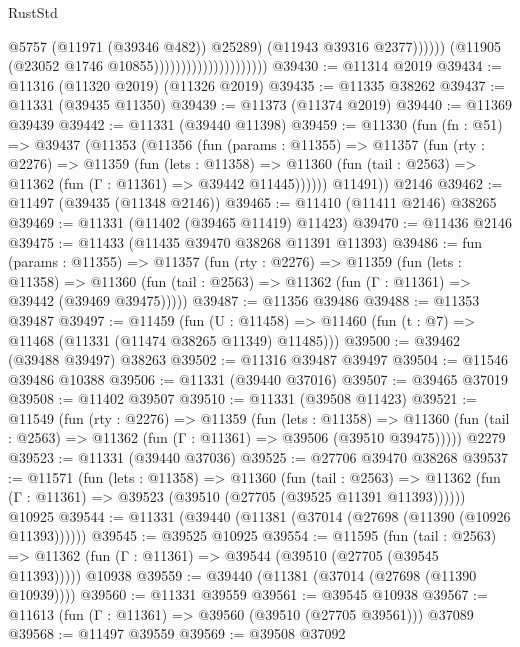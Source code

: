 \begin{lexlean}{RustStd}
\begin{coremodule}
                                                      @5757
                                                      (@11971 (@39346 @482))
                                                      @25289)
                                                    (@11943 @39316 @2377))))))
                                          (@11905 (@23052 @1746 @10855)))))))))))))))))))))
@39430 := @11314 @2019
@39434 := @11316 (@11320 @2019) (@11326 @2019)
@39435 := @11335 @38262
@39437 := @11331 (@39435 @11350)
@39439 := @11373 (@11374 @2019)
@39440 := @11369 @39439
@39442 := @11331 (@39440 @11398)
@39459 := @11330
    (fun (fn : @51) =>
    @39437
      (@11353
        (@11356
          (fun (params : @11355) =>
          @11357
            (fun (rty : @2276) =>
            @11359
              (fun (lets : @11358) =>
              @11360 (fun (tail : @2563) => @11362 (fun (Γ : @11361) => @39442 @11445))))))
        @11491))
    @2146
@39462 := @11497 (@39435 (@11348 @2146))
@39465 := @11410 (@11411 @2146) @38265
@39469 := @11331 (@11402 (@39465 @11419) @11423)
@39470 := @11436 @2146
@39475 := @11433 (@11435 @39470 @38268 @11391 @11393)
@39486 := fun (params : @11355) =>
  @11357
    (fun (rty : @2276) =>
    @11359
      (fun (lets : @11358) =>
      @11360 (fun (tail : @2563) => @11362 (fun (Γ : @11361) => @39442 (@39469 @39475)))))
@39487 := @11356 @39486
@39488 := @11353 @39487
@39497 := @11459
    (fun (U : @11458) => @11460 (fun (t : @7) => @11468 (@11331 (@11474 @38265 @11349) @11485)))
@39500 := @39462 (@39488 @39497) @38263
@39502 := @11316 @39487 @39497
@39504 := @11546 @39486 @10388
@39506 := @11331 (@39440 @37016)
@39507 := @39465 @37019
@39508 := @11402 @39507
@39510 := @11331 (@39508 @11423)
@39521 := @11549
    (fun (rty : @2276) =>
    @11359
      (fun (lets : @11358) =>
      @11360 (fun (tail : @2563) => @11362 (fun (Γ : @11361) => @39506 (@39510 @39475)))))
    @2279
@39523 := @11331 (@39440 @37036)
@39525 := @27706 @39470 @38268
@39537 := @11571
    (fun (lets : @11358) =>
    @11360
      (fun (tail : @2563) =>
      @11362 (fun (Γ : @11361) => @39523 (@39510 (@27705 (@39525 @11391 @11393))))))
    @10925
@39544 := @11331 (@39440 (@11381 (@37014 (@27698 (@11390 (@10926 @11393))))))
@39545 := @39525 @10925
@39554 := @11595
    (fun (tail : @2563) => @11362 (fun (Γ : @11361) => @39544 (@39510 (@27705 (@39545 @11393)))))
    @10938
@39559 := @39440 (@11381 (@37014 (@27698 (@11390 @10939))))
@39560 := @11331 @39559
@39561 := @39545 @10938
@39567 := @11613 (fun (Γ : @11361) => @39560 (@39510 (@27705 @39561))) @37089
@39568 := @11497 @39559
@39569 := @39508 @37092

\end{coremodule}
\end{lexlean}

